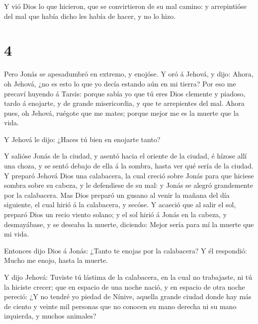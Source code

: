  Y vió Dios lo que hicieron, que se convirtieron de su mal
camino: y arrepintióse del mal que había dicho les había de hacer, y no
lo hizo.

\hypertarget{section-3}{%
\section{4}\label{section-3}}

 Pero Jonás se apesadumbró en extremo, y enojóse.
 Y oró á Jehová, y dijo: Ahora, oh Jehová, ¿no es esto lo
que yo decía estando aún en mi tierra? Por eso me precaví huyendo á
Tarsis: porque sabía yo que tú eres Dios clemente y piadoso, tardo á
enojarte, y de grande misericordia, y que te arrepientes del mal.
 Ahora pues, oh Jehová, ruégote que me mates; porque mejor
me es la muerte que la vida.

 Y Jehová le dijo: ¿Haces tú bien en enojarte tanto?

 Y salióse Jonás de la ciudad, y asentó hacia el oriente de
la ciudad, é hízose allí una choza, y se sentó debajo de ella á la
sombra, hasta ver qué sería de la ciudad.  Y preparó Jehová
Dios una calabacera, la cual creció sobre Jonás para que hiciese sombra
sobre su cabeza, y le defendiese de su mal: y Jonás se alegró
grandemente por la calabacera.  Mas Dios preparó un gusano
al venir la mañana del día siguiente, el cual hirió á la calabacera, y
secóse.  Y acaeció que al salir el sol, preparó Dios un
recio viento solano; y el sol hirió á Jonás en la cabeza, y desmayábase,
y se deseaba la muerte, diciendo: Mejor sería para mí la muerte que mi
vida.

 Entonces dijo Dios á Jonás: ¿Tanto te enojas por la
calabacera? Y él respondió: Mucho me enojo, hasta la muerte.

 Y dijo Jehová: Tuviste tú lástima de la calabacera, en la
cual no trabajaste, ni tú la hiciste crecer; que en espacio de una noche
nació, y en espacio de otra noche pereció:  ¿Y no tendré yo
piedad de Nínive, aquella grande ciudad donde hay más de ciento y veinte
mil personas que no conocen su mano derecha ni su mano izquierda, y
muchos animales?
